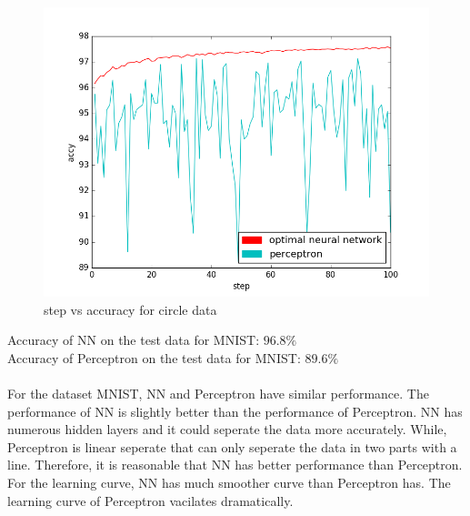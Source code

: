 \begin{enumerate}
\begin{enumerate}
\begin{enumerate}
\begin{figure}[H]
				\includegraphics[width=\linewidth]{figure_mnist.png}
				\caption{step vs accuracy for circle data}
			\end{figure}
			Accuracy of NN on the test data for MNIST: $96.8\%$\\
			Accuracy of Perceptron on the test data for MNIST: $89.6\%$\\\\
			For the dataset MNIST, NN and Perceptron have similar performance. The performance of NN is slightly better than the performance of Perceptron. NN has numerous hidden layers and it could seperate the data more accurately. While, Perceptron is linear seperate that can only seperate the data in two parts with a line. Therefore, it is reasonable that NN has better performance than Perceptron. For the learning curve, NN has much smoother curve than Perceptron has. The learning curve of Perceptron vacilates dramatically.
		\end{enumerate}
	\end{enumerate}


\end{enumerate}
